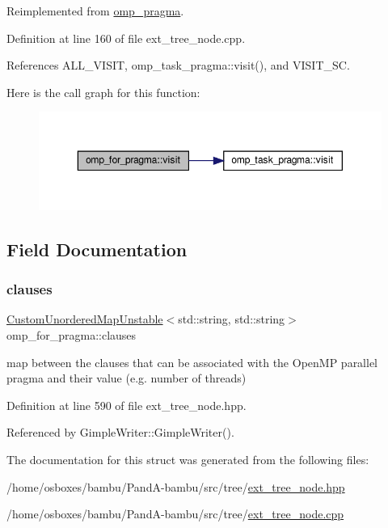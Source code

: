 Reimplemented from \hyperlink{structomp__pragma_a2e2c445528b7e097ae76fa618a9970b5}{omp\+\_\+pragma}.



Definition at line 160 of file ext\+\_\+tree\+\_\+node.\+cpp.



References A\+L\+L\+\_\+\+V\+I\+S\+IT, omp\+\_\+task\+\_\+pragma\+::visit(), and V\+I\+S\+I\+T\+\_\+\+SC.

Here is the call graph for this function\+:
\nopagebreak
\begin{figure}[H]
\begin{center}
\leavevmode
\includegraphics[width=350pt]{d1/d0c/structomp__for__pragma_aaedfb731b705c0abadbc9fcb4a7bafef_cgraph}
\end{center}
\end{figure}


\subsection{Field Documentation}
\mbox{\label{structomp__for__pragma_a9821205024efc4880ab77fdcc80b55dc}} 
\subsubsection{\texorpdfstring{clauses}{clauses}}
{\footnotesize\ttfamily \hyperlink{custom__map_8hpp_a8cbaceffc09790a885ec7e9c17809c69}{Custom\+Unordered\+Map\+Unstable}$<$std\+::string, std\+::string$>$ omp\+\_\+for\+\_\+pragma\+::clauses}



map between the clauses that can be associated with the Open\+MP parallel pragma and their value (e.\+g. number of threads) 



Definition at line 590 of file ext\+\_\+tree\+\_\+node.\+hpp.



Referenced by Gimple\+Writer\+::\+Gimple\+Writer().



The documentation for this struct was generated from the following files\+:\begin{DoxyCompactItemize}
\item 
/home/osboxes/bambu/\+Pand\+A-\/bambu/src/tree/\hyperlink{ext__tree__node_8hpp}{ext\+\_\+tree\+\_\+node.\+hpp}\item 
/home/osboxes/bambu/\+Pand\+A-\/bambu/src/tree/\hyperlink{ext__tree__node_8cpp}{ext\+\_\+tree\+\_\+node.\+cpp}\end{DoxyCompactItemize}
